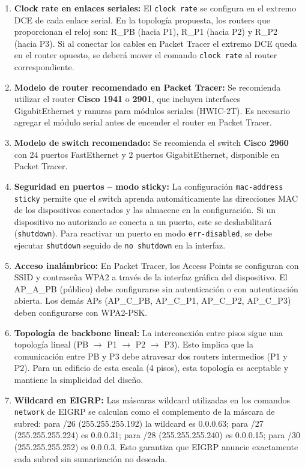 \documentclass[letterpaper,11pt]{article}
\begin{document}
\begin{enumerate}
    \item \textbf{Clock rate en enlaces seriales:} El \texttt{clock rate} se configura en el extremo DCE de cada enlace serial. En la topología propuesta, los routers que proporcionan el reloj son: R\_PB (hacia P1), R\_P1 (hacia P2) y R\_P2 (hacia P3). Si al conectar los cables en Packet Tracer el extremo DCE queda en el router opuesto, se deberá mover el comando \texttt{clock rate} al router correspondiente.

    \item \textbf{Modelo de router recomendado en Packet Tracer:} Se recomienda utilizar el router \textbf{Cisco 1941} o \textbf{2901}, que incluyen interfaces GigabitEthernet y ranuras para módulos seriales (HWIC-2T). Es necesario agregar el módulo serial antes de encender el router en Packet Tracer.

    \item \textbf{Modelo de switch recomendado:} Se recomienda el switch \textbf{Cisco 2960} con 24 puertos FastEthernet y 2 puertos GigabitEthernet, disponible en Packet Tracer.

    \item \textbf{Seguridad en puertos -- modo sticky:} La configuración \texttt{mac-address sticky} permite que el switch aprenda automáticamente las direcciones MAC de los dispositivos conectados y las almacene en la configuración. Si un dispositivo no autorizado se conecta a un puerto, este se deshabilitará (\texttt{shutdown}). Para reactivar un puerto en modo \texttt{err-disabled}, se debe ejecutar \texttt{shutdown} seguido de \texttt{no shutdown} en la interfaz.

    \item \textbf{Acceso inalámbrico:} En Packet Tracer, los Access Points se configuran con SSID y contraseña WPA2 a través de la interfaz gráfica del dispositivo. El AP\_A\_PB (público) debe configurarse sin autenticación o con autenticación abierta. Los demás APs (AP\_C\_PB, AP\_C\_P1, AP\_C\_P2, AP\_C\_P3) deben configurarse con WPA2-PSK.

    \item \textbf{Topología de backbone lineal:} La interconexión entre pisos sigue una topología lineal (PB $\rightarrow$ P1 $\rightarrow$ P2 $\rightarrow$ P3). Esto implica que la comunicación entre PB y P3 debe atravesar dos routers intermedios (P1 y P2). Para un edificio de esta escala (4 pisos), esta topología es aceptable y mantiene la simplicidad del diseño.

    \item \textbf{Wildcard en EIGRP:} Las máscaras wildcard utilizadas en los comandos \texttt{network} de EIGRP se calculan como el complemento de la máscara de subred: para /26 (255.255.255.192) la wildcard es 0.0.0.63; para /27 (255.255.255.224) es 0.0.0.31; para /28 (255.255.255.240) es 0.0.0.15; para /30 (255.255.255.252) es 0.0.0.3. Esto garantiza que EIGRP anuncie exactamente cada subred sin sumarización no deseada.


\end{enumerate}
\end{document}
